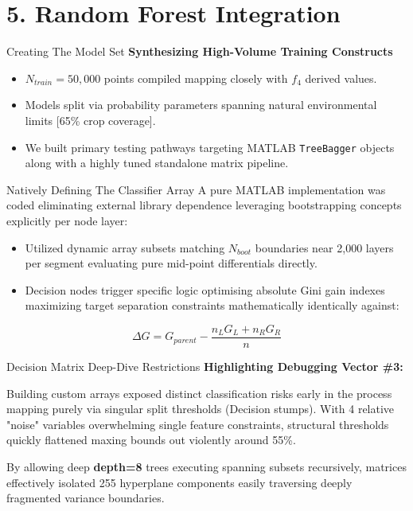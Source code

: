 \documentclass[10pt,aspectratio=169]{beamer}
\begin{document}
\section{5. Random Forest Integration}

\begin{frame}{Creating The Model Set}
    \textbf{Synthesizing High-Volume Training Constructs}
    \begin{itemize}
        \item $N_{train} = 50,000$ points compiled mapping closely with $f_4$ derived values.
        \item Models split via probability parameters spanning natural environmental limits [65\% crop coverage].
        \item We built primary testing pathways targeting MATLAB \texttt{TreeBagger} objects along with a highly tuned standalone matrix pipeline.
    \end{itemize}
\end{frame}

\begin{frame}{Natively Defining The Classifier Array}
    A pure MATLAB implementation was coded eliminating external library dependence leveraging bootstrapping concepts explicitly per node layer:
    
    \vspace{3mm}
    \begin{itemize}
        \item Utilized dynamic array subsets matching $N_{boot}$ boundaries near 2,000 layers per segment evaluating pure mid-point differentials directly.
        \item Decision nodes trigger specific logic optimising absolute Gini gain indexes maximizing target separation constraints mathematically identically against:
    \end{itemize}
    \begin{equation}
        \Delta G = G_{parent} - \frac{n_L G_L + n_R G_R}{n}
    \end{equation}
\end{frame}

\begin{frame}{Decision Matrix Deep-Dive Restrictions}
    \textbf{Highlighting Debugging Vector \#3:}
    \vspace{3mm}
    
    Building custom arrays exposed distinct classification risks early in the process mapping purely via singular split thresholds (Decision stumps). With 4 relative "noise" variables overwhelming single feature constraints, structural thresholds quickly flattened maxing bounds out violently around 55\%.
    
    \vspace{4mm}
    By allowing deep \textbf{depth=8} trees executing spanning subsets recursively, matrices effectively isolated 255 hyperplane components easily traversing deeply fragmented variance boundaries.
\end{frame}
\end{document}
